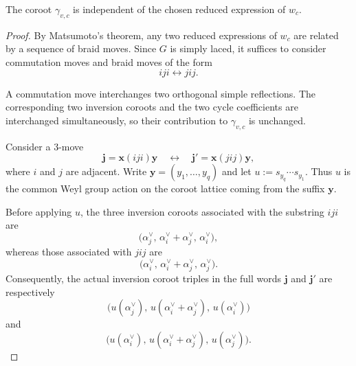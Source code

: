 \documentclass[10pt,a4paper]{amsart}
\begin{document}
\begin{lemma}
\label{lem:gamma-vc-well-defined}
The coroot \(\gamma_{v,c}\) is independent of the chosen reduced
expression of \(w_c\).
\end{lemma}

\begin{proof}
By Matsumoto's theorem, any two reduced expressions of \(w_c\) are
related by a sequence of braid moves. Since \(G\) is simply laced, it
suffices to consider commutation moves and braid moves of the form
\[
    iji\longleftrightarrow jij.
\]

A commutation move interchanges two orthogonal simple reflections.
The corresponding two inversion coroots and the two cycle
coefficients are interchanged simultaneously, so their contribution
to \(\gamma_{v,c}\) is unchanged.

Consider a \(3\)-move
\[
    \mathbf j=\mathbf x(iji)\mathbf y
    \quad\longleftrightarrow\quad
    \mathbf j'=\mathbf x(jij)\mathbf y,
\]
where \(i\) and \(j\) are adjacent. Write
\(
    \mathbf y=(y_1,\ldots,y_q)
\)
and let
\(
    u:=s_{y_q}\cdots s_{y_1}.
\)
Thus \(u\) is the common Weyl group action on the coroot lattice
coming from the suffix \(\mathbf y\).

Before applying \(u\), the three inversion coroots associated with
the substring \(iji\) are
\[
    \bigl(
        \alpha_j^\vee,\,
        \alpha_i^\vee+\alpha_j^\vee,\,
        \alpha_i^\vee
    \bigr),
\]
whereas those associated with \(jij\) are
\[
    \bigl(
        \alpha_i^\vee,\,
        \alpha_i^\vee+\alpha_j^\vee,\,
        \alpha_j^\vee
    \bigr).
\]
Consequently, the actual inversion coroot triples in the full words
\(\mathbf j\) and \(\mathbf j'\) are respectively
\[
    \bigl(
        u(\alpha_j^\vee),\,
        u(\alpha_i^\vee+\alpha_j^\vee),\,
        u(\alpha_i^\vee)
    \bigr)
\]
and
\[
    \bigl(
        u(\alpha_i^\vee),\,
        u(\alpha_i^\vee+\alpha_j^\vee),\,
        u(\alpha_j^\vee)
    \bigr).
\]


\end{proof}
\end{document}
